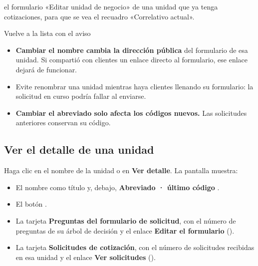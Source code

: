   {el formulario «Editar unidad de negocio» de una unidad que ya tenga cotizaciones, para que
   se vea el recuadro «Correlativo actual».}

\begin{resultado}
Vuelve a la lista con el aviso 
\end{resultado}

\begin{importante}
\begin{itemize}
  \item \textbf{Cambiar el nombre cambia la dirección pública} del formulario de esa unidad. Si
        compartió con clientes un enlace directo al formulario, ese enlace dejará de funcionar.
  \item Evite renombrar una unidad mientras haya clientes llenando su formulario: la solicitud
        en curso podría fallar al enviarse.
  \item \textbf{Cambiar el abreviado solo afecta los códigos nuevos.} Las solicitudes anteriores
        conservan su código.
\end{itemize}
\end{importante}

\subsection{Ver el detalle de una unidad}

Haga clic en el nombre de la unidad o en \icono[pizarra]{\icVer} \textbf{Ver detalle}. La
pantalla muestra:

\begin{itemize}
  \item El nombre como título y, debajo, \textbf{Abreviado  · último código
        }.
  \item El botón .
  \item La tarjeta \textbf{Preguntas del formulario de solicitud}, con el número de preguntas de
        su árbol de decisión y el enlace \textbf{Editar el formulario}
        ().
  \item La tarjeta \textbf{Solicitudes de cotización}, con el número de solicitudes recibidas en
        esa unidad y el enlace \textbf{Ver solicitudes} ().
\end{itemize}

